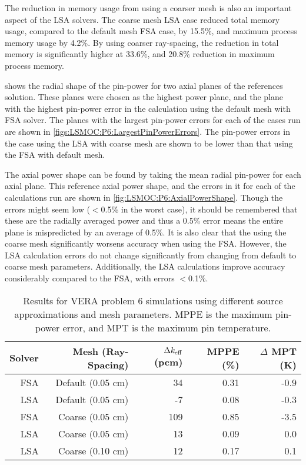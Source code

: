 {{{      The reduction in memory usage from using a coarser mesh is also an important aspect of the \ac{LSA} solvers.
      The coarse mesh \ac{LSA} case reduced total memory usage, compared to the default mesh \ac{FSA} case, by 15.5\%, and maximum process memory usage by 4.2\%.
      By using coarser ray-spacing, the reduction in total memory is significantly higher at 33.6\%, and 20.8\% reduction in maximum process memory.

       shows the radial shape of the pin-power for two axial planes of the references solution.
      These planes were chosen as the highest power plane, and the plane with the highest pin-power error in the calculation using the default mesh with \ac{FSA} solver.
      The planes with the largest pin-power errors for each of the cases run are shown in \cref{figs:LSMOC:P6:LargestPinPowerErrors}.
      The pin-power errors in the case using the \ac{LSA} with coarse mesh are shown to be lower than that using the \ac{FSA} with default mesh.

      The axial power shape can be found by taking the mean radial pin-power for each axial plane.
      This reference axial power shape, and the errors in it for each of the calculations run are shown in \cref{fig:LSMOC:P6:AxialPowerShape}.
      Though the errors might seem low ($<$0.5\% in the worst case), it should be remembered that these are the radially averaged power and thus a 0.5\% error means the entire plane is mispredicted by an average of 0.5\%.
      It is also clear that the using the coarse mesh significantly worsens accuracy when using the \ac{FSA}.
      However, the \ac{LSA} calculation errors do not change significantly from changing from default to coarse mesh parameters.
      Additionally, the \ac{LSA} calculations improve accuracy considerably compared to the \ac{FSA}, with errors $<$0.1\%.

      \begin{table}[htbp]
        \centering
        \caption{
          Results for VERA problem 6 simulations using different source approximations and mesh parameters.
          MPPE is the maximum pin-power error, and MPT is the maximum pin temperature.}
        \label{tab:LSMOC:P6:Results}
        \begin{tabular}{rrrrr}\toprule
          Solver & Mesh (Ray-Spacing) & $\Delta k_{\text{eff}}$ (pcm) & MPPE (\%) & $\Delta$ MPT (K)\\\midrule
          FSA    & Default (0.05 cm)  & 34    & 0.31 & -0.9\\
          LSA    & Default (0.05 cm)  & -7    & 0.08 & -0.3\\
          FSA    & Coarse  (0.05 cm)  & 109   & 0.85 & -3.5\\
          LSA    & Coarse  (0.05 cm)  & 13    & 0.09 &  0.0\\
          LSA    & Coarse  (0.10 cm)  & 12    & 0.17 &  0.1\\\bottomrule
        \end{tabular}
      \end{table}

}}}
